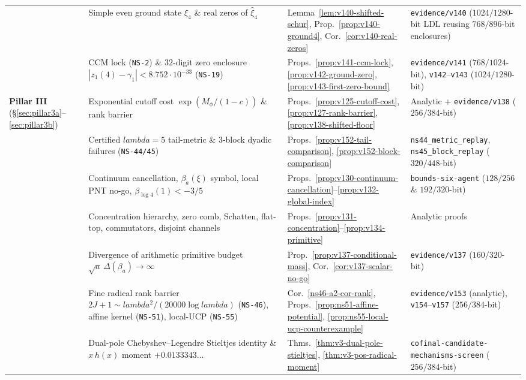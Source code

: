 \documentclass[11pt]{article}
\def\lambda{lambda}%
\theoremstyle{remark}
\begin{document}
\begin{table}[htbp]
\begin{tabular}{>{\raggedright\arraybackslash}p{2.0cm}>{\raggedright\arraybackslash}p{5.2cm}>{\raggedright\arraybackslash}p{3.4cm}>{\raggedright\arraybackslash}p{3.9cm}}
 & Simple even ground state $\xi_4$ \& real zeros of $\widehat{\xi}_4$ & Lemma~\ref{lem:v140-shifted-schur}, Prop.~\ref{prop:v140-ground4}, Cor.~\ref{cor:v140-real-zeros} & \texttt{evidence/v140} ($1024/1280$-bit LDL reusing $768/896$-bit enclosures) \\
 & CCM lock (\texttt{NS-2}) \& $32$-digit zero enclosure $|z_1(4)-\gamma_1|<8.752\cdot 10^{-33}$ (\texttt{NS-19}) & Props.~\ref{prop:v141-ccm-lock}, \ref{prop:v142-ground-zero}, \ref{prop:v143-first-zero-bound} & \texttt{evidence/v141} ($768/1024$-bit), \texttt{v142}--\texttt{v143} ($1024/1280$-bit) \\
\midrule
\textbf{Pillar III} (\S\ref{sec:pillar3a}--\ref{sec:pillar3b}) & Exponential cutoff cost $\exp(M_\phi/(1-c))$ \& rank barrier & Props.~\ref{prop:v125-cutoff-cost}, \ref{prop:v127-rank-barrier}, \ref{prop:v138-shifted-floor} & Analytic + \texttt{evidence/v138} ($256/384$-bit) \\
 & Certified $\lambda=5$ tail-metric \& 3-block dyadic failures (\texttt{NS-44/45}) & Props.~\ref{prop:v152-tail-comparison}, \ref{prop:v152-block-comparison} & \texttt{ns44\_metric\_replay}, \texttt{ns45\_block\_replay} ($320/448$-bit) \\
 & Continuum cancellation, $\beta_a(\xi)$ symbol, local PNT no-go, $\beta_{\log 4}(1)<-3/5$ & Props.~\ref{prop:v130-continuum-cancellation}--\ref{prop:v132-global-index} & \texttt{bounds-six-agent} ($128/256$ \& $192/320$-bit) \\
 & Concentration hierarchy, zero comb, Schatten, flat-top, commutators, disjoint channels & Props.~\ref{prop:v131-concentration}--\ref{prop:v134-primitive} & Analytic proofs \\
 & Divergence of arithmetic primitive budget $\sqrt{a}\,\Delta(\beta_a)\to\infty$ & Prop.~\ref{prop:v137-conditional-mass}, Cor.~\ref{cor:v137-scalar-no-go} & \texttt{evidence/v137} ($160/320$-bit) \\
 & Fine radical rank barrier $2J+1\sim\lambda^2/(20000\log\lambda)$ (\texttt{NS-46}), affine kernel (\texttt{NS-51}), local-UCP (\texttt{NS-55}) & Cor.~\ref{ns46-a2-cor-rank}, Props.~\ref{prop:ns51-affine-potential}, \ref{prop:ns55-local-ucp-counterexample} & \texttt{evidence/v153} (analytic), \texttt{v154}--\texttt{v157} ($256/384$-bit) \\
 & Dual-pole Chebyshev--Legendre Stieltjes identity \& $x\,h(x)$ moment $+0.0133343\dots$ & Thms.~\ref{thm:v3-dual-pole-stieltjes}, \ref{thm:v3-pos-radical-moment} & \texttt{cofinal-\allowbreak candidate-\allowbreak mechanisms-\allowbreak screen} ($256/384$-bit) \\

\end{tabular}
\end{table}
\end{document}
